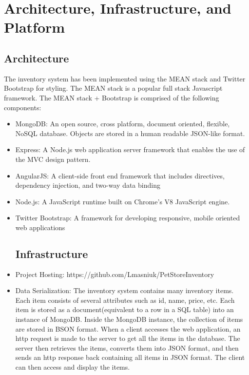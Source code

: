 \documentclass[letterpaper, 12pt]{article}
\begin{document}
\section{Architecture, Infrastructure, and Platform}

\subsection{Architecture}
\noindent The inventory system has been implemented using the MEAN stack and Twitter Bootstrap for styling. The MEAN stack is a popular full stack Javascript framework. The MEAN stack + Bootstrap is comprised of the following components:
\begin{itemize}
\item MongoDB: An open source, cross platform, document oriented, flexible, NoSQL database. Objects are stored in a human readable JSON-like format.
\item Express: A Node.js web application server framework that enables the use of the MVC design pattern.
\item AngularJS: A client-side front end framework that includes directives, dependency injection, and two-way data binding
\item Node.js: A JavaScript runtime built on Chrome's V8 JavaScript engine.
\item Twitter Bootstrap: A framework for developing responsive, mobile oriented web applications

\subsection{Infrastructure}

\item Project Hosting:
 https://github.com/Lmasniuk/PetStoreInventory


\item Data Serialization:
The inventory system contains many inventory items. Each item consists of several attributes such as id, name, price, etc. Each item is stored as a document(equivalent to a row in a SQL table) into an instance of MongoDB. Inside the MongoDB instance, the collection of items are stored in BSON format. When a client accesses the web application, an http request is made to the server to get all the items in the database. The server then retrieves the items, converts them into JSON format, and then sends an http response back containing all items in JSON format. The client can then access and display the items. 
\end{itemize}
\end{document}
